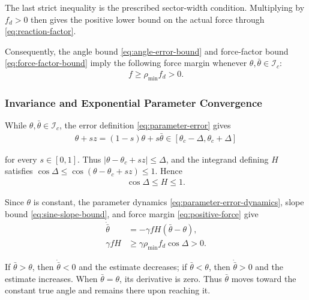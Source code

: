 \documentclass[10pt,journal,letterpaper]{IEEEtran}
\begin{document}
The last strict inequality is the prescribed sector-width condition. Multiplying by $f_d>0$ then gives the positive lower bound on the actual force through \eqref{eq:reaction-factor}.

Consequently, the angle bound \eqref{eq:angle-error-bound} and force-factor bound \eqref{eq:force-factor-bound} imply the following force margin whenever $\theta,\bar\theta\in\mathcal I_c$:
\begin{equation}\label{eq:positive-force}
\begin{aligned}
f\geq\rho_{\min}f_d>0.
\end{aligned}
\end{equation}

\subsubsection{Invariance and Exponential Parameter Convergence}

While $\theta,\bar\theta\in\mathcal I_c$, the error definition \eqref{eq:parameter-error} gives
\begin{align*}
\theta+s z=(1-s)\theta+s\bar\theta\in[\theta_c-\Delta,\theta_c+\Delta]
\end{align*}

for every $s\in[0,1]$. Thus $|\theta-\theta_c+s z|\leq\Delta$, and the integrand defining $H$ satisfies $\cos\Delta\leq\cos(\theta-\theta_c+s z)\leq1$. Hence
\begin{equation}\label{eq:sine-slope-bound}
\begin{aligned}
\cos\Delta\leq H\leq1.
\end{aligned}
\end{equation}

Since $\theta$ is constant, the parameter dynamics \eqref{eq:parameter-error-dynamics}, slope bound \eqref{eq:sine-slope-bound}, and force margin \eqref{eq:positive-force} give
\begin{equation}\label{eq:effective-angle-dynamics}
\begin{aligned}
\dot{\bar\theta}&=-\gamma fH(\bar\theta-\theta),\\
\gamma fH&\geq\gamma\rho_{\min}f_d\cos\Delta>0.
\end{aligned}
\end{equation}

If $\bar\theta>\theta$, then $\dot{\bar\theta}<0$ and the estimate decreases; if $\bar\theta<\theta$, then $\dot{\bar\theta}>0$ and the estimate increases. When $\bar\theta=\theta$, its derivative is zero. Thus $\bar\theta$ moves toward the constant true angle and remains there upon reaching it.
\end{document}
